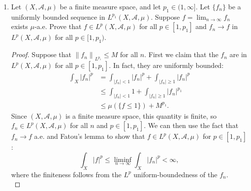 \documentclass[11pt,letterpaper]{report}
\newcommand{\reals}{\mathbb{R}}
\newcommand{\mcal}[1]{\mathcal{#1}}
\newcommand{\Lp}[2]{\left\|{#1}\right\|_{L^{#2}}}
\begin{document}
\begin{enumerate}
\begin{proof}
		\noindent Let $f_n$ and $g_n$ be sequences in $C_0(\reals)$ converging in $L^2$ to $f$ and $g$, respectively. We then have
		\begin{align*}
			|(f*g)(x)-(f_n*g_n)(x)| &\leq |(f*g)(x)-(f_n*g)(x)| + |(f_n*g)(x)-(f_n*g_n)(x)|\\
			&\leq \Lp{g}{2}\cdot \Lp{f-f_n}{2} + \Lp{f_n}{2}\cdot \Lp{g-g_n}{2}.
		\end{align*}
		Since $f_n\to f$ and $g_n\to g$ in $L^2$, we have that $f_n*g_n$ converges uniformly to $f*g$. Since $f_n*g_n$ vanishes at infinity, we must then have that $f*g$ vanishes at infinity.
	\end{proof}

	\item Let $(X, \mcal{A}, \mu)$ be a finite measure space, and let $p_1\in (1, \infty]$. Let $\{f_n\}$ be a uniformly bounded sequence in $L^{p_1}(X, \mcal{A}, \mu)$. Suppose $f = \lim_{n\to \infty}f_n$ exists $\mu$-a.e. Prove that $f\in L^p(X, \mcal{A}, \mu)$ for all $p\in [1, p_1]$ and $f_n\to f$ in $L^p(X, \mcal{A}, \mu)$ for all $p\in [1, p_1)$.
	\begin{proof}
		Suppose that $\Lp{f_n}{p_1}\leq M$ for all $n$. First we claim that the $f_n$ are in $L^p(X, \mcal{A}, \mu)$ for all $p\in [1, p_1]$. In fact, they are uniformly bounded:
		\begin{equation}\label{s16_4_main}
		\begin{split}
			\int_X|f_n|^p &= \int_{|f_n|<1}|f_n|^p + \int_{|f_n|\geq 1}|f_n|^p\\
			&\leq \int_{|f_n|<1}1 + \int_{|f_n|\geq 1}|f_n|^{p_1}\\
			&\leq \mu(\{f\leq 1\}) + M^{p_1}.
		\end{split}
		\end{equation}
		Since $(X, \mcal{A}, \mu)$ is a finite measure space, this quantity is finite, so $f_n\in L^p(X, \mcal{A}, \mu)$ for all $n$ and $p\in [1, p_1]$. We can then use the fact that $f_n\to f$ a.e. and Fatou's lemma to show that $f\in L^p(X, \mcal{A}, \mu)$ for $p\in [1, p_1]$:
		\[
		\int_X|f|^p \leq \liminf_{n\to \infty}\int_X|f_n|^p<\infty,
		\]
		where the finiteness follows from the $L^p$ uniform-boundedness of the $f_n$.\\


\end{proof}
\end{enumerate}
\end{document}

